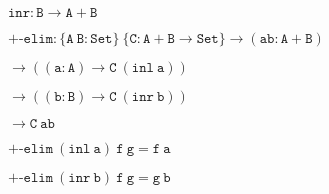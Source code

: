 \hspace{0.25cm}
{\small{$\mathtt{inr : B \to A + B}$}}

\vspace{0.25cm}

{\small{$\mathtt{+\text{-}elim : \{A ~B : Set\} ~\{C : A + B \to Set\} \to (ab : A + B)}$}}

\vspace{-0.1cm}

\hspace{6.2cm}
{\small{$\mathtt{\to ((a : A) \to C ~(inl ~a))}$}}

\vspace{-0.1cm}

\hspace{6.2cm}
{\small{$\mathtt{\to ((b : B) \to C ~(inr ~b))}$}}

\vspace{-0.1cm}

\hspace{6.2cm}
{\small{$\mathtt{\to C ~ab}$}}

{\small{$\mathtt{+\text{-}elim ~(inl ~a) ~f ~g = f ~a}$}}

{\small{$\mathtt{+\text{-}elim ~(inr ~b) ~f ~g = g ~b}$}}
















